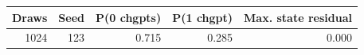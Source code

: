 \begin{tabular}{rrrrr}
\toprule
Draws & Seed & P(0 chgpts) & P(1 chgpt) & Max. state residual \\
\midrule
1024 & 123 & 0.715 & 0.285 & 0.000 \\
\bottomrule
\end{tabular}
